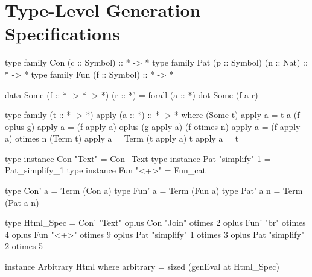 \section{Type-Level Generation Specifications}
\label{sec:typelevel}



\begin{code}
type family Con (c :: Symbol)             :: * -> *
type family Pat (p :: Symbol) (n :: Nat)  :: * -> *
type family Fun (f :: Symbol)             :: * -> *
\end{code}

\begin{code}
data Some (f :: * -> * -> *) (r :: *) = forall (a :: *) dot Some (f a r)
\end{code}

\begin{code}
type family (t :: * -> *) apply (a :: *) :: * -> *  where
  (Some t)      apply  a  = t a
  (f oplus g)   apply  a  = (f apply a) oplus (g apply a)
  (f otimes n)  apply  a  = (f apply a) otimes n
  (Term t)      apply  a  = Term (t apply a)
  t             apply  a  = t
\end{code}

\begin{code}
type instance Con "Text"        = Con_Text
type instance Pat "simplify" 1  = Pat_simplify_1
type instance Fun "<+>"         = Fun_cat
\end{code}

\begin{code}
type Con' a    = Term  (Con a)
type Fun' a    = Term  (Fun a)
type Pat' a n  = Term  (Pat a n)
\end{code}

\begin{code}
type Html_Spec
  =      Con'  "Text"
  oplus  Con   "Join"         otimes 2
  oplus  Fun'  "br"           otimes 4
  oplus  Fun   "<+>"          otimes 9
  oplus  Pat   "simplify"  1  otimes 3
  oplus  Pat   "simplify"  2  otimes 5
\end{code}


\begin{code}
instance Arbitrary Html where
  arbitrary = sized (genEval at Html_Spec)
\end{code}